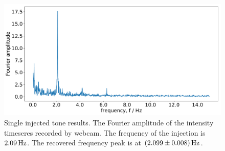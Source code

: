 \documentclass[paper-main.tex]{subfiles}
\begin{document}
\begin{figure}
	\includegraphics[width=.49\textwidth]{figures/webcam_expt_4_0209-cropped.pdf}
	\caption{\label{fig:webcam_spectrum}
Single injected tone results. 
The Fourier amplitude of the intensity timeseres recorded by webcam. 
The frequency of the injection is $2.09\,{\rm Hz}$. 
The recovered frequency peak is at $(2.099\pm 0.008)\,{\rm Hz}$. 
}
	
\end{figure}
\end{document}
